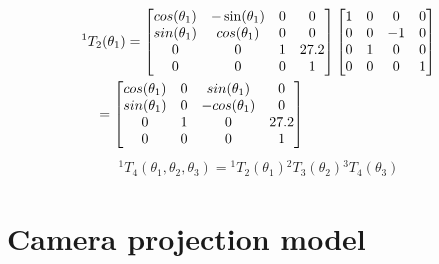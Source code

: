 \documentclass{article}
\begin{document}
\begin{align}
  &{}^1T_2(\theta_1) =
    \begin{bmatrix}
      cos(\theta_1) & -\sin(\theta_1) & 0 & 0 \\
      sin(\theta_1) & cos(\theta_1) & 0 & 0 \\
      0 & 0 & 1 & 27.2 \\
      0 & 0 & 0 & 1
    \end{bmatrix}
                  \begin{bmatrix}
                    1 & 0 & 0 & 0 \\
                    0 & 0 & -1 & 0 \\
                    0 & 1 & 0 & 0 \\
                    0 & 0 & 0 & 1
                  \end{bmatrix}
                                \notag\\
  &\quad= \begin{bmatrix}
    cos(\theta_1) & 0 & sin(\theta_1) & 0 \\
    sin(\theta_1) & 0 & -cos(\theta_1) & 0 \\
    0 & 1 & 0 & 27.2 \\
    0 & 0 & 0 & 1
  \end{bmatrix}
\end{align}
\begin{align}
  {}^1T_4(\theta_1, \theta_2, \theta_3) = {}^1T_2(\theta_1) {}^2T_3(\theta_2) {}^3T_4(\theta_3)
\end{align}
\fi
\section{Camera  projection model}
\end{document}
